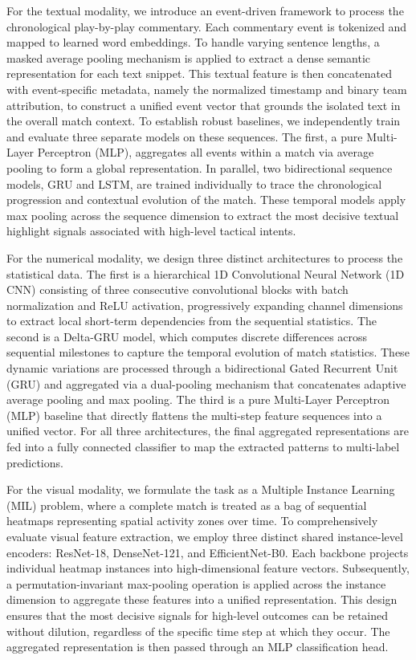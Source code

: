 For the textual modality, we introduce an event-driven framework to process the chronological play-by-play commentary. Each commentary event is tokenized and mapped to learned word embeddings. To handle varying sentence lengths, a masked average pooling mechanism is applied to extract a dense semantic representation for each text snippet. This textual feature is then concatenated with event-specific metadata, namely the normalized timestamp and binary team attribution, to construct a unified event vector that grounds the isolated text in the overall match context. To establish robust baselines, we independently train and evaluate three separate models on these sequences. The first, a pure Multi-Layer Perceptron (MLP), aggregates all events within a match via average pooling to form a global representation. In parallel, two bidirectional sequence models, GRU and LSTM, are trained individually to trace the chronological progression and contextual evolution of the match. These temporal models apply max pooling across the sequence dimension to extract the most decisive textual highlight signals associated with high-level tactical intents.

For the numerical modality, we design three distinct architectures to process the statistical data. The first is a hierarchical 1D Convolutional Neural Network (1D CNN) consisting of three consecutive convolutional blocks with batch normalization and ReLU activation, progressively expanding channel dimensions to extract local short-term dependencies from the sequential statistics. The second is a Delta-GRU model, which computes discrete differences across sequential milestones to capture the temporal evolution of match statistics. These dynamic variations are processed through a bidirectional Gated Recurrent Unit (GRU) and aggregated via a dual-pooling mechanism that concatenates adaptive average pooling and max pooling. The third is a pure Multi-Layer Perceptron (MLP) baseline that directly flattens the multi-step feature sequences into a unified vector. For all three architectures, the final aggregated representations are fed into a fully connected classifier to map the extracted patterns to multi-label predictions.

For the visual modality, we formulate the task as a Multiple Instance Learning (MIL) problem, where a complete match is treated as a bag of sequential heatmaps representing spatial activity zones over time. To comprehensively evaluate visual feature extraction, we employ three distinct shared instance-level encoders: ResNet-18, DenseNet-121, and EfficientNet-B0. Each backbone projects individual heatmap instances into high-dimensional feature vectors. Subsequently, a permutation-invariant max-pooling operation is applied across the instance dimension to aggregate these features into a unified representation. This design ensures that the most decisive signals for high-level outcomes can be retained without dilution, regardless of the specific time step at which they occur. The aggregated representation is then passed through an MLP classification head.

